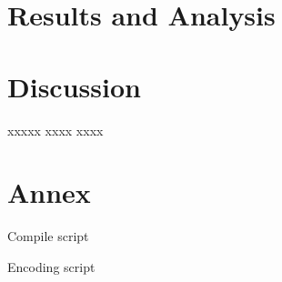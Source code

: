 \documentclass[12pt,twoside]{article}
\begin{document}
\section{Results and Analysis}
\label{sec:results}


\section{Discussion}
\label{sec:discussion}
xxxxx xxxx xxxx 

\printbibliography
\appendix
\section{Annex}
Compile script

Encoding script

\end{document}
